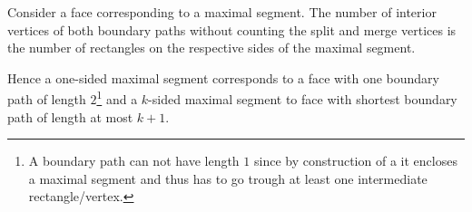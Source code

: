     Consider a face corresponding to a maximal segment.
    The number of interior vertices of both boundary paths without counting the split and merge vertices is the number of rectangles on the respective sides of the maximal segment.

    Hence a one-sided maximal segment corresponds to a face with one boundary path of length $2$\footnote{A boundary path can not have length $1$ since by construction of a \rel it encloses a maximal segment and thus has to go trough at least one intermediate rectangle/vertex.} and a $k$-sided maximal segment to face with shortest boundary path of length at most $k+1$.
